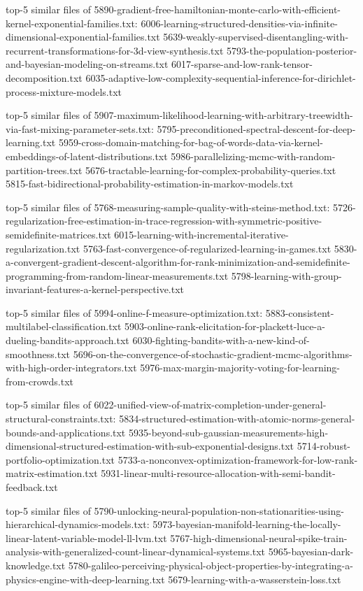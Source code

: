 \documentclass[11pt]{article}
\begin{document}
top-5 similar files of
5890-gradient-free-hamiltonian-monte-carlo-with-efficient-kernel-exponential-families.txt:
6006-learning-structured-densities-via-infinite-dimensional-exponential-families.txt
5639-weakly-supervised-disentangling-with-recurrent-transformations-for-3d-view-synthesis.txt
5793-the-population-posterior-and-bayesian-modeling-on-streams.txt
6017-sparse-and-low-rank-tensor-decomposition.txt
6035-adaptive-low-complexity-sequential-inference-for-dirichlet-process-mixture-models.txt

top-5 similar files of
5907-maximum-likelihood-learning-with-arbitrary-treewidth-via-fast-mixing-parameter-sets.txt:
5795-preconditioned-spectral-descent-for-deep-learning.txt
5959-cross-domain-matching-for-bag-of-words-data-via-kernel-embeddings-of-latent-distributions.txt
5986-parallelizing-mcmc-with-random-partition-trees.txt
5676-tractable-learning-for-complex-probability-queries.txt
5815-fast-bidirectional-probability-estimation-in-markov-models.txt

top-5 similar files of
5768-measuring-sample-quality-with-steins-method.txt:
5726-regularization-free-estimation-in-trace-regression-with-symmetric-positive-semidefinite-matrices.txt
6015-learning-with-incremental-iterative-regularization.txt
5763-fast-convergence-of-regularized-learning-in-games.txt
5830-a-convergent-gradient-descent-algorithm-for-rank-minimization-and-semidefinite-programming-from-random-linear-measurements.txt
5798-learning-with-group-invariant-features-a-kernel-perspective.txt

top-5 similar files of 5994-online-f-measure-optimization.txt:
5883-consistent-multilabel-classification.txt
5903-online-rank-elicitation-for-plackett-luce-a-dueling-bandits-approach.txt
6030-fighting-bandits-with-a-new-kind-of-smoothness.txt
5696-on-the-convergence-of-stochastic-gradient-mcmc-algorithms-with-high-order-integrators.txt
5976-max-margin-majority-voting-for-learning-from-crowds.txt

top-5 similar files of
6022-unified-view-of-matrix-completion-under-general-structural-constraints.txt:
5834-structured-estimation-with-atomic-norms-general-bounds-and-applications.txt
5935-beyond-sub-gaussian-measurements-high-dimensional-structured-estimation-with-sub-exponential-designs.txt
5714-robust-portfolio-optimization.txt
5733-a-nonconvex-optimization-framework-for-low-rank-matrix-estimation.txt
5931-linear-multi-resource-allocation-with-semi-bandit-feedback.txt

top-5 similar files of
5790-unlocking-neural-population-non-stationarities-using-hierarchical-dynamics-models.txt:
5973-bayesian-manifold-learning-the-locally-linear-latent-variable-model-ll-lvm.txt
5767-high-dimensional-neural-spike-train-analysis-with-generalized-count-linear-dynamical-systems.txt
5965-bayesian-dark-knowledge.txt
5780-galileo-perceiving-physical-object-properties-by-integrating-a-physics-engine-with-deep-learning.txt
5679-learning-with-a-wasserstein-loss.txt
\end{document}

